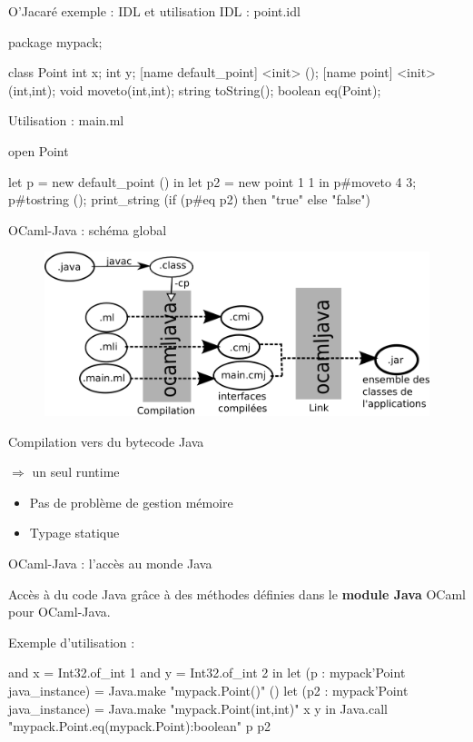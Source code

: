 \documentclass[xcolor={table,dvipsnames}]{beamer}
\begin{document}
\begin{frame}[fragile]{O'Jacaré exemple : IDL et utilisation}
  IDL : point.idl
\begin{idlEx} 
package mypack;

class Point {
  int x;
  int y; 
  [name default_point] <init> ();
  [name point] <init> (int,int);
  void moveto(int,int);
  string toString();
  boolean eq(Point);
}
\end{idlEx}

Utilisation : main.ml
\begin{OCamlEx}
  open Point

  let p = new default_point () in
  let p2 = new point 1 1 in
  p#moveto 4 3;
  p#tostring ();
  print_string (if (p#eq p2) then "true" else "false")
\end{OCamlEx}
\end{frame}




\begin{frame}{OCaml-Java : schéma global}
\begin{figure}[h!]
  \centering
  \includegraphics[scale=0.8]{schemaOCamlJava.png}
\end{figure}
Compilation vers du bytecode Java

$\Rightarrow$ un seul runtime
\begin{itemize}
\item Pas de problème de gestion mémoire
\item Typage statique
\end{itemize}
\end{frame}





\begin{frame}[fragile]{OCaml-Java : l'accès au monde Java}

  Accès à du code Java grâce à des méthodes définies dans le
  \textbf{module Java} OCaml pour OCaml-Java.

\bigskip

Exemple d'utilisation :

\begin{OCamlEx}
and x = Int32.of_int 1
and y = Int32.of_int 2 in
let (p : mypack'Point java_instance) = 
   Java.make "mypack.Point()" ()
let (p2 : mypack'Point java_instance) = 
   Java.make "mypack.Point(int,int)" x y 
in
   Java.call "mypack.Point.eq(mypack.Point):boolean" p p2
\end{OCamlEx}

\end{frame}
\end{document}
